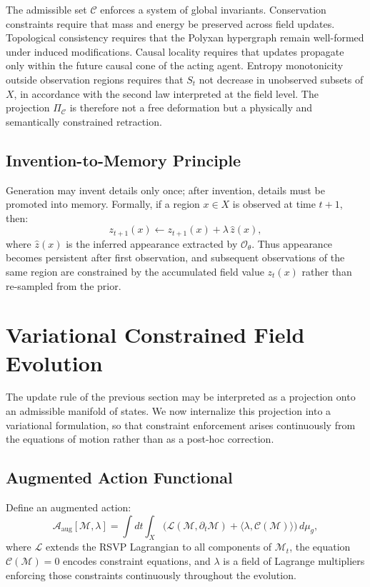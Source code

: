 \documentclass[11pt]{article}
\begin{document}
The admissible set $\mathcal{C}$ enforces a system of global invariants.
Conservation constraints require that mass and energy be preserved across
field updates.
Topological consistency requires that the Polyxan hypergraph remain
well-formed under induced modifications.
Causal locality requires that updates propagate only within the future
causal cone of the acting agent.
Entropy monotonicity outside observation regions requires that $S_t$
not decrease in unobserved subsets of $X$, in accordance with the second
law interpreted at the field level.
The projection $\Pi_{\mathcal{C}}$ is therefore not a free deformation
but a physically and semantically constrained retraction.

\subsection{Invention-to-Memory Principle}

Generation may invent details only once; after invention, details must be
promoted into memory.
Formally, if a region $x \in X$ is observed at time $t+1$, then:
\[
z_{t+1}(x) \gets z_{t+1}(x) + \lambda\, \hat{z}(x),
\]
where $\hat{z}(x)$ is the inferred appearance extracted by
$\mathcal{O}_\theta$.
Thus appearance becomes persistent after first observation, and subsequent
observations of the same region are constrained by the accumulated field
value $z_t(x)$ rather than re-sampled from the prior.

\section{Variational Constrained Field Evolution}

The update rule of the previous section may be interpreted as a projection
onto an admissible manifold of states.
We now internalize this projection into a variational formulation, so that
constraint enforcement arises continuously from the equations of motion
rather than as a post-hoc correction.

\subsection{Augmented Action Functional}

Define an augmented action:
\[
\mathcal{A}_{\text{aug}}[\mathcal{M},\lambda]
=
\int dt \int_X
\Big(
\mathcal{L}(\mathcal{M}, \partial_t \mathcal{M})
+
\langle \lambda, \mathcal{C}(\mathcal{M}) \rangle
\Big)\, d\mu_g,
\]
where $\mathcal{L}$ extends the RSVP Lagrangian to all components of
$\mathcal{M}_t$, the equation $\mathcal{C}(\mathcal{M})=0$ encodes
constraint equations, and $\lambda$ is a field of Lagrange multipliers
enforcing those constraints continuously throughout the evolution.
\end{document}

